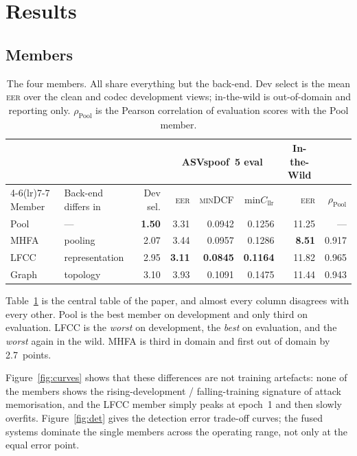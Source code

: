 \documentclass[11pt,a4paper]{article}
\newcommand{\eer}{\textsc{eer}}
\newcommand{\mindcf}{\textsc{minDCF}}
\newcommand{\best}[1]{\textbf{#1}}
\begin{document}
\section{Results}

\subsection{Members}

\begin{table}[t]
\centering
\small
\caption{The four members. All share everything but the back-end. Dev select is the mean \eer{} over
the clean and codec development views; in-the-wild is out-of-domain and reporting only.
$\rho_{\text{Pool}}$ is the Pearson correlation of evaluation scores with the Pool member.}
\label{tab:members}
\begin{tabular}{llrrrrrr}
\toprule
& & & \multicolumn{3}{c}{ASVspoof~5 eval} & \multicolumn{1}{c}{In-the-Wild} & \\
\cmidrule(lr){4-6}\cmidrule(lr){7-7}
Member & Back-end differs in & Dev sel. & \eer{} & \mindcf{} & min$C_\text{llr}$ & \eer{} & $\rho_{\text{Pool}}$ \\
\midrule
Pool  & ---                 & \best{1.50} & 3.31 & 0.0942 & 0.1256 & 11.25 & --- \\
MHFA  & pooling             & 2.07 & 3.44 & 0.0957 & 0.1286 & \best{8.51} & 0.917 \\
LFCC  & representation      & 2.95 & \best{3.11} & \best{0.0845} & \best{0.1164} & 11.82 & 0.965 \\
Graph & topology            & 3.10 & 3.93 & 0.1091 & 0.1475 & 11.44 & 0.943 \\
\bottomrule
\end{tabular}
\end{table}

Table~\ref{tab:members} is the central table of the paper, and almost every column disagrees with
every other. Pool is the best member on development and only third on evaluation. LFCC is the
\emph{worst} on development, the \emph{best} on evaluation, and the \emph{worst} again in the wild.
MHFA is third in domain and first out of domain by 2.7~points.

Figure~\ref{fig:curves} shows that these differences are not training artefacts: none of the members
shows the rising-development / falling-training signature of attack memorisation, and the LFCC member
simply peaks at epoch~1 and then slowly overfits. Figure~\ref{fig:det} gives the detection error
trade-off curves; the fused systems dominate the single members across the operating range, not only
at the equal error point.
\end{document}
